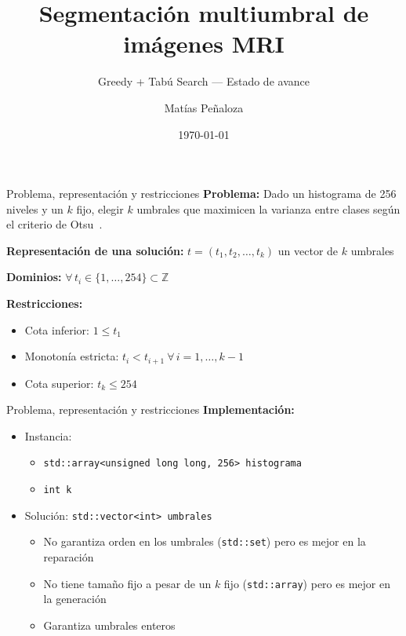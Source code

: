 \documentclass[aspectratio=169, 10pt]{beamer}
\title{Segmentación multiumbral de imágenes MRI}
\subtitle{Greedy + Tabú Search --- Estado de avance}
\author{Matías Peñaloza}
\institute{Inteligencia Artificial 2026-2}
\date{\today}
\begin{document}
\begin{frame}
  \titlepage
\end{frame}

\begin{frame}{Problema, representación y restricciones}
  \textbf{Problema:} Dado un histograma de 256 niveles y un $k$ fijo, elegir $k$
  umbrales que maximicen la varianza entre clases según el criterio de
  Otsu~\cite{Otsu1979}.

  \textbf{Representación de una solución:}
  $t = (t_1, t_2, \ldots, t_k)$ un vector de $k$ umbrales

  \textbf{Dominios:} $\forall\, t_i \in \{1, \ldots, 254\} \subset \mathbb{Z}$

  \textbf{Restricciones:}
  \begin{itemize}
    \item Cota inferior: $1 \leq t_1$
    \item Monotonía estricta: $t_i < t_{i+1}\ \forall\, i = 1, \ldots, k-1$
    \item Cota superior: $t_k \leq 254$
  \end{itemize}

\end{frame}

\begin{frame}{Problema, representación y restricciones}
  \textbf{Implementación:}
  \begin{itemize}
    \item Instancia:
    \begin{itemize}
      \item \texttt{std::array<unsigned long long, 256> histograma}
      \item \texttt{int k}
    \end{itemize}
    \item Solución: \texttt{std::vector<int> umbrales}
    \begin{itemize}
      \item No garantiza orden en los umbrales (\texttt{std::set}) pero es mejor en la reparación
      \item No tiene tamaño fijo a pesar de un $k$ fijo (\texttt{std::array}) pero es mejor en la generación
      \item Garantiza umbrales enteros
    \end{itemize}
  \end{itemize}
\end{frame}
\end{document}
